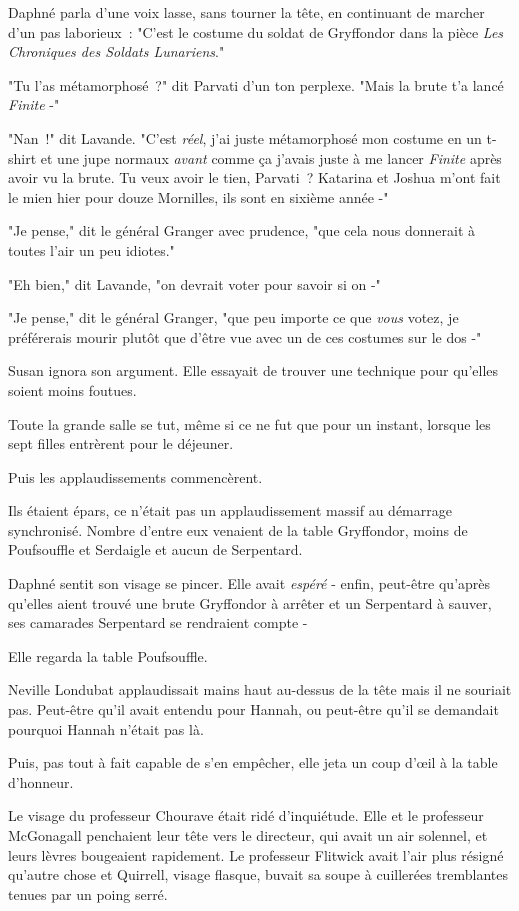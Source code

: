 Daphné parla d'une voix lasse, sans tourner la tête, en continuant de marcher d'un pas laborieux~: "C'est le costume du soldat de Gryffondor dans la pièce \emph{Les Chroniques des Soldats Lunariens}."

"Tu l'as métamorphosé~?" dit Parvati d'un ton perplexe. "Mais la brute t'a lancé \emph{Finite} -"

"Nan~!" dit Lavande. "C'est \emph{réel}, j'ai juste métamorphosé mon costume en un t-shirt et une jupe normaux \emph{avant} comme ça j'avais juste à me lancer \emph{Finite} après avoir vu la brute. Tu veux avoir le tien, Parvati~? Katarina et Joshua m'ont fait le mien hier pour douze Mornilles, ils sont en sixième année -"

"Je pense," dit le général Granger avec prudence, "que cela nous donnerait à toutes l'air un peu idiotes."

"Eh bien," dit Lavande, "on devrait voter pour savoir si on -"

"Je pense," dit le général Granger, "que peu importe ce que \emph{vous} votez, je préférerais mourir plutôt que d'être vue avec un de ces costumes sur le dos -"

Susan ignora son argument. Elle essayait de trouver une technique pour qu'elles soient moins foutues.

\later

Toute la grande salle se tut, même si ce ne fut que pour un instant, lorsque les sept filles entrèrent pour le déjeuner.

Puis les applaudissements commencèrent.

Ils étaient épars, ce n'était pas un applaudissement massif au démarrage synchronisé. Nombre d'entre eux venaient de la table Gryffondor, moins de Poufsouffle et Serdaigle et aucun de Serpentard.

Daphné sentit son visage se pincer. Elle avait \emph{espéré} - enfin, peut-être qu'après qu'elles aient trouvé une brute Gryffondor à arrêter et un Serpentard à sauver, ses camarades Serpentard se rendraient compte -

Elle regarda la table Poufsouffle.

Neville Londubat applaudissait mains haut au-dessus de la tête mais il ne souriait pas. Peut-être qu'il avait entendu pour Hannah, ou peut-être qu'il se demandait pourquoi Hannah n'était pas là.

Puis, pas tout à fait capable de s'en empêcher, elle jeta un coup d'œil à la table d'honneur.

Le visage du professeur Chourave était ridé d'inquiétude. Elle et le professeur McGonagall penchaient leur tête vers le directeur, qui avait un air solennel, et leurs lèvres bougeaient rapidement. Le professeur Flitwick avait l'air plus résigné qu'autre chose et Quirrell, visage flasque, buvait sa soupe à cuillerées tremblantes tenues par un poing serré.

